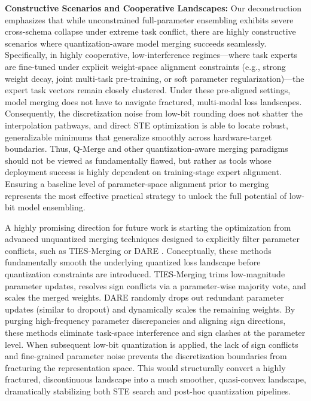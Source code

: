 \textbf{Constructive Scenarios and Cooperative Landscapes:} Our deconstruction emphasizes that while unconstrained full-parameter ensembling exhibits severe cross-schema collapse under extreme task conflict, there are highly constructive scenarios where quantization-aware model merging succeeds seamlessly. Specifically, in highly cooperative, low-interference regimes---where task experts are fine-tuned under explicit weight-space alignment constraints (e.g., strong weight decay, joint multi-task pre-training, or soft parameter regularization)---the expert task vectors remain closely clustered. Under these pre-aligned settings, model merging does not have to navigate fractured, multi-modal loss landscapes. Consequently, the discretization noise from low-bit rounding does not shatter the interpolation pathways, and direct STE optimization is able to locate robust, generalizable minimums that generalize smoothly across hardware-target boundaries. Thus, Q-Merge and other quantization-aware merging paradigms should not be viewed as fundamentally flawed, but rather as tools whose deployment success is highly dependent on training-stage expert alignment. Ensuring a baseline level of parameter-space alignment prior to merging represents the most effective practical strategy to unlock the full potential of low-bit model ensembling.

A highly promising direction for future work is starting the optimization from advanced unquantized merging techniques designed to explicitly filter parameter conflicts, such as TIES-Merging \cite{yadav2023ties} or DARE \cite{yu2024dare}. Conceptually, these methods fundamentally smooth the underlying quantized loss landscape before quantization constraints are introduced. TIES-Merging trims low-magnitude parameter updates, resolves sign conflicts via a parameter-wise majority vote, and scales the merged weights. DARE randomly drops out redundant parameter updates (similar to dropout) and dynamically scales the remaining weights. By purging high-frequency parameter discrepancies and aligning sign directions, these methods eliminate task-space interference and sign clashes at the parameter level. When subsequent low-bit quantization is applied, the lack of sign conflicts and fine-grained parameter noise prevents the discretization boundaries from fracturing the representation space. This would structurally convert a highly fractured, discontinuous landscape into a much smoother, quasi-convex landscape, dramatically stabilizing both STE search and post-hoc quantization pipelines.

